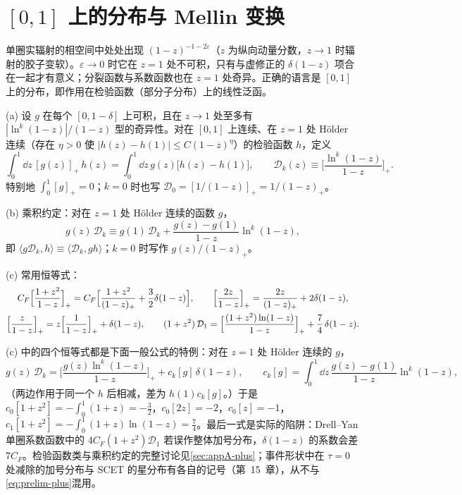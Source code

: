 \section{$[0,1]$ 上的分布与 Mellin 变换}\label{sec:prelim-distributions}

单圈实辐射的相空间中处处出现 $(1-z)^{-1-2\varepsilon}$（$z$ 为纵向动量分数，$z\to1$ 时辐射的胶子变软）。$\varepsilon\to0$ 时它在 $z=1$ 处不可积，只有与虚修正的 $\delta(1-z)$ 项合在一起才有意义；分裂函数与系数函数也在 $z=1$ 处奇异。正确的语言是 $[0,1]$ 上的分布，即作用在检验函数（部分子分布）上的线性泛函。

\begin{definition}[加号分布]\label{def:prelim-plus}
(a) 设 $g$ 在每个 $[0,1-\delta]$ 上可积，且在 $z\to1$ 处至多有 $|\ln^k(1-z)|/(1-z)$ 型的奇异性。对在 $[0,1]$ 上连续、在 $z=1$ 处 Hölder 连续（存在 $\eta>0$ 使 $|h(z)-h(1)|\le C(1-z)^\eta$）的检验函数 $h$，定义
\begin{equation}\label{eq:prelim-plus}
\int_0^1\dd z\,[g(z)]_+\,h(z)=\int_0^1\dd z\,g(z)\big[h(z)-h(1)\big],\qquad \mathcal D_k(z)\equiv\Big[\frac{\ln^k(1-z)}{1-z}\Big]_+ . %
\end{equation}
特别地 $\int_0^1[g]_+=0$；$k=0$ 时也写 $\mathcal D_0=[1/(1-z)]_+=1/(1-z)_+$。
\par
(b) 乘积约定：对在 $z=1$ 处 Hölder 连续的函数 $g$，
\begin{equation}\label{eq:prelim-product}
g(z)\,\mathcal D_k\equiv g(1)\,\mathcal D_k+\frac{g(z)-g(1)}{1-z}\ln^k(1-z),
\end{equation}
即 $\langle g\mathcal D_k,h\rangle\equiv\langle\mathcal D_k,gh\rangle$；$k=0$ 时写作 $g(z)/(1-z)_+$。
\par
(c) 常用恒等式：
\begin{gather}
C_F\Big[\frac{1+z^2}{1-z}\Big]_+=C_F\Big[\frac{1+z^2}{(1-z)_+}+\frac32\delta(1-z)\Big],\qquad
\Big[\frac{2z}{1-z}\Big]_+=\frac{2z}{(1-z)_+}+2\delta(1-z),\notag\\
\Big[\frac{z}{1-z}\Big]_+=z\Big[\frac1{1-z}\Big]_++\delta(1-z),\qquad
(1+z^2)\,\mathcal D_1=\Big[\frac{(1+z^2)\ln(1-z)}{1-z}\Big]_++\frac74\,\delta(1-z). \label{eq:prelim-plus-identities} %
\end{gather}
\end{definition}

(c) 中的四个恒等式都是下面一般公式的特例：对在 $z=1$ 处 Hölder 连续的 $g$，
\begin{equation}\label{eq:prelim-ck}
g(z)\,\mathcal D_k=\Big[\frac{g(z)\ln^k(1-z)}{1-z}\Big]_++c_k[g]\,\delta(1-z),\qquad c_k[g]=\int_0^1\dd z\,\frac{g(z)-g(1)}{1-z}\ln^k(1-z),
\end{equation}
（两边作用于同一个 $h$ 后相减，差为 $h(1)c_k[g]$。）于是 $c_0[1+z^2]=-\int_0^1(1+z)=-\frac32$，$c_0[2z]=-2$，$c_0[z]=-1$，$c_1[1+z^2]=-\int_0^1(1+z)\ln(1-z)=\frac74$。最后一式是实际的陷阱：Drell--Yan 单圈系数函数中的 $4C_F(1+z^2)\mathcal D_1$ 若误作整体加号分布，$\delta(1-z)$ 的系数会差 $7C_F$。检验函数类与乘积约定的完整讨论见\cref{sec:appA-plus}；事件形状中在 $\tau=0$ 处减除的加号分布与 SCET 的星分布有各自的记号（第~15~章），从不与\cref{eq:prelim-plus}混用。


